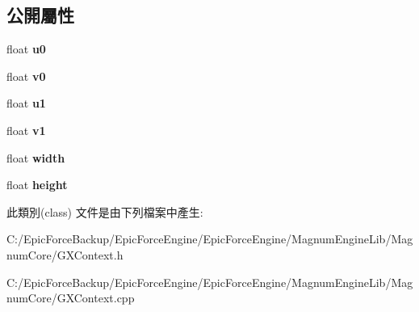 \subsection*{公開屬性}
\begin{DoxyCompactItemize}
\item 
float {\bfseries u0}\hypertarget{class_magnum_1_1_g_x_context_1_1_quad_ae41af14186d472c76130252d539bec0c}{}\label{class_magnum_1_1_g_x_context_1_1_quad_ae41af14186d472c76130252d539bec0c}

\item 
float {\bfseries v0}\hypertarget{class_magnum_1_1_g_x_context_1_1_quad_a0077b3cec3ef6aa83789c6fa68d5e59d}{}\label{class_magnum_1_1_g_x_context_1_1_quad_a0077b3cec3ef6aa83789c6fa68d5e59d}

\item 
float {\bfseries u1}\hypertarget{class_magnum_1_1_g_x_context_1_1_quad_a57b82fcaa4ce2591774ee52e91d52d8b}{}\label{class_magnum_1_1_g_x_context_1_1_quad_a57b82fcaa4ce2591774ee52e91d52d8b}

\item 
float {\bfseries v1}\hypertarget{class_magnum_1_1_g_x_context_1_1_quad_a2a219bc8e914ad7735ce807671910868}{}\label{class_magnum_1_1_g_x_context_1_1_quad_a2a219bc8e914ad7735ce807671910868}

\item 
float {\bfseries width}\hypertarget{class_magnum_1_1_g_x_context_1_1_quad_ad2c376063ab90c293b72f99c5cca9c99}{}\label{class_magnum_1_1_g_x_context_1_1_quad_ad2c376063ab90c293b72f99c5cca9c99}

\item 
float {\bfseries height}\hypertarget{class_magnum_1_1_g_x_context_1_1_quad_a1c81ff3db2cfc53a4e242858ddeef74d}{}\label{class_magnum_1_1_g_x_context_1_1_quad_a1c81ff3db2cfc53a4e242858ddeef74d}

\end{DoxyCompactItemize}


此類別(class) 文件是由下列檔案中產生\+:\begin{DoxyCompactItemize}
\item 
C\+:/\+Epic\+Force\+Backup/\+Epic\+Force\+Engine/\+Epic\+Force\+Engine/\+Magnum\+Engine\+Lib/\+Magnum\+Core/G\+X\+Context.\+h\item 
C\+:/\+Epic\+Force\+Backup/\+Epic\+Force\+Engine/\+Epic\+Force\+Engine/\+Magnum\+Engine\+Lib/\+Magnum\+Core/G\+X\+Context.\+cpp\end{DoxyCompactItemize}
